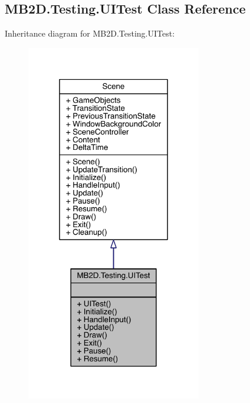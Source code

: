 \hypertarget{class_m_b2_d_1_1_testing_1_1_u_i_test}{}\subsection{M\+B2\+D.\+Testing.\+U\+I\+Test Class Reference}
\label{class_m_b2_d_1_1_testing_1_1_u_i_test}


Inheritance diagram for M\+B2\+D.\+Testing.\+U\+I\+Test\+:
\nopagebreak
\begin{figure}[H]
\begin{center}
\leavevmode
\includegraphics[width=217pt]{class_m_b2_d_1_1_testing_1_1_u_i_test__inherit__graph}
\end{center}
\end{figure}



